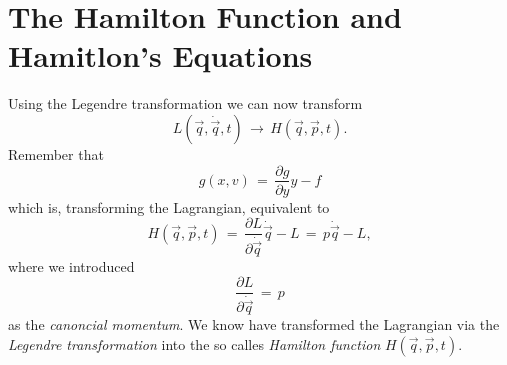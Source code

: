 \section{The Hamilton Function and Hamitlon's Equations}
Using the Legendre transformation we can now transform
\begin{equation}
  L(\vec q, \dot{\vec q}, t) \,\to\, H(\vec q, \vec p, t).
\end{equation}
Remember that
\begin{equation}
  g(x, v) \,=\, \frac{\partial g}{\partial y} y - f
\end{equation}
which is, transforming the Lagrangian, equivalent to
\begin{equation}
  H(\vec q, \vec p, t) \,=\, \frac{\partial L}{\partial \dot{\vec q}}
\dot{\vec q} - L \,=\, p \dot{\vec q} - L ,
\end{equation}
where we introduced
\begin{equation}
  \frac{\partial L}{\partial \dot{\vec q}} \,=\, p
\end{equation}
as the \textit{canoncial momentum}. We know have transformed the Lagrangian via
the \textit{Legendre transformation} into the so calles \textit{Hamilton
function} $H(\vec q, \vec p, t)$.

